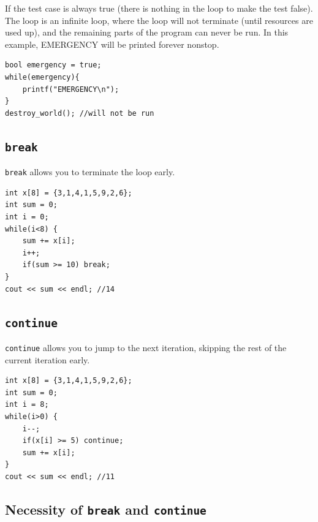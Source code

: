 If the test case is always true (there is nothing in the loop to make the test false). The loop is an infinite loop, where the loop will not terminate (until resources are used up), and the remaining parts of the program can never be run. In this example, EMERGENCY will be printed forever nonstop.

\begin{lstlisting}
bool emergency = true;
while(emergency){
    printf("EMERGENCY\n");
}
destroy_world(); //will not be run
\end{lstlisting}
\vspace{6mm}

\subsection{\texttt{break}}

\texttt{break} allows you to terminate the loop early.

\begin{lstlisting}
int x[8] = {3,1,4,1,5,9,2,6};
int sum = 0;
int i = 0;
while(i<8) { 
    sum += x[i];
    i++;
    if(sum >= 10) break;
}
cout << sum << endl; //14
\end{lstlisting}

\subsection{\texttt{continue}}

\texttt{continue} allows you to jump to the next iteration, skipping the rest of the current iteration early.

\begin{lstlisting}
int x[8] = {3,1,4,1,5,9,2,6};
int sum = 0;
int i = 8;
while(i>0) {
    i--;
    if(x[i] >= 5) continue;
    sum += x[i];
}
cout << sum << endl; //11
\end{lstlisting}

\subsection{Necessity of \texttt{break} and \texttt{continue}}



